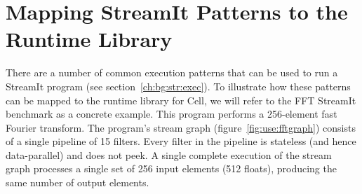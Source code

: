 \chapter{Mapping StreamIt Patterns to the Runtime Library}\label{ch:use}

There are a number of common execution patterns that can be used to run a StreamIt program (see section~\ref{ch:bg:str:exec}). To illustrate how these patterns can be mapped to the runtime library for Cell, we will refer to the FFT StreamIt benchmark as a concrete example. This program performs a 256-element fast Fourier transform. The program's stream graph (figure~\ref{fig:use:fftgraph}) consists of a single pipeline of 15 filters. Every filter in the pipeline is stateless (and hence data-parallel) and does not peek. A single complete execution of the stream graph processes a single set of 256 input elements (512 floats), producing the same number of output elements.

